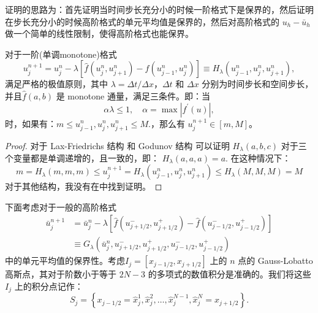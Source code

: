 \documentclass{book}
\begin{document}
证明的思路为：首先证明当时间步长充分小的时候一阶格式下是保界的，然后证明在步长充分小的时候高阶格式的单元平均值是保界的，然后对高阶格式的 $u_h-\bar{u}_h$ 做一个简单的线性限制，使得高阶格式也能保界。

\begin{theorem}
  对于一阶(单调monotone)格式
  \begin{equation}
    u_{j}^{n+1}=u_{j}^{n}-\lambda\left[\hat{f}\left(u_{j}^{n}, u_{j+1}^{n}\right)-\hat{f}\left(u_{j-1}^{n}, u_{j}^{n}\right)\right] \equiv H_{\lambda}\left(u_{j-1}^{n}, u_{j}^{n}, u_{j+1}^{n}\right),
  \end{equation}
  满足严格的极值原则，其中 $\lambda=\Delta t / \Delta x$，$\Delta t$  和  $\Delta x$ 分别为时间步长和空间步长，并且$\hat{f}(a, b)$ 是 monotone 通量，满足三条件。即：当
  \begin{equation}
    \label{eqa:pp_1D_1Order_CFL}
    \alpha \lambda \leq 1, \quad \alpha=\max \left|f^{\prime}(u)\right|,
  \end{equation}
  时，如果有：$m \leq u_{j-1}^{n}, u_{j}^{n}, u_{j+1}^{n} \leq M .$，那么有 $u_{j}^{n+1}\in[m,M]$。
\end{theorem}
\begin{proof}
  对于 Lax-Friedrichs 结构 和 Godunov 结构
  可以证明 $H_{\lambda}(a, b, c)$  对于三个变量都是单调递增的，且一致的，即： $H_{\lambda}(a, a, a)=a$. 在这种情况下：
  \begin{equation}
    m=H_{\lambda}(m, m, m) \leq u_{j}^{n+1}=H_{\lambda}\left(u_{j-1}^{n}, u_{j}^{n}, u_{j+1}^{n}\right) \leq H_{\lambda}(M, M, M)=M
  \end{equation}
  对于其他结构，我没有在\cite{PP-review}中找到证明。
\end{proof}
下面考虑对于一般的高阶格式
\begin{equation}
  \label{eqa:pp_high_order_scheme}
  \begin{aligned}
    \bar{u}_{j}^{n+1} & =\bar{u}_{j}^{n}-\lambda\left[\hat{f}\left(u_{j+1 / 2}^{-}, u_{j+1 / 2}^{+}\right)-\hat{f}\left(u_{j-1 / 2}^{-}, u_{j-1 / 2}^{+}\right)\right] \\
                      & \equiv G_{\lambda}\left(\bar{u}_{j}^{n}, u_{j+1 / 2}^{-}, u_{j+1 / 2}^{+}, u_{j-1 / 2}^{-}, u_{j-1 / 2}^{+}\right)
  \end{aligned}
\end{equation}
中的单元平均值的保界性。考虑$I_{j}=\left[x_{j-1 / 2}, x_{j+1 / 2}\right]$ 上的 $n$ 点的 Gauss-Lobatto 高斯点，其对于阶数小于等于 $2N-3$ 的多项式的数值积分是准确的。我们将这些 $I_{j}$ 上的积分点记作：
\begin{equation}
  S_{j}=\left\{x_{j-1 / 2}=\hat{x}_{j}^{1}, \hat{x}_{j}^{2}, \ldots, \hat{x}_{j}^{N-1}, \hat{x}_{j}^{N}=x_{j+1 / 2}\right\} .
\end{equation}
\end{document}
